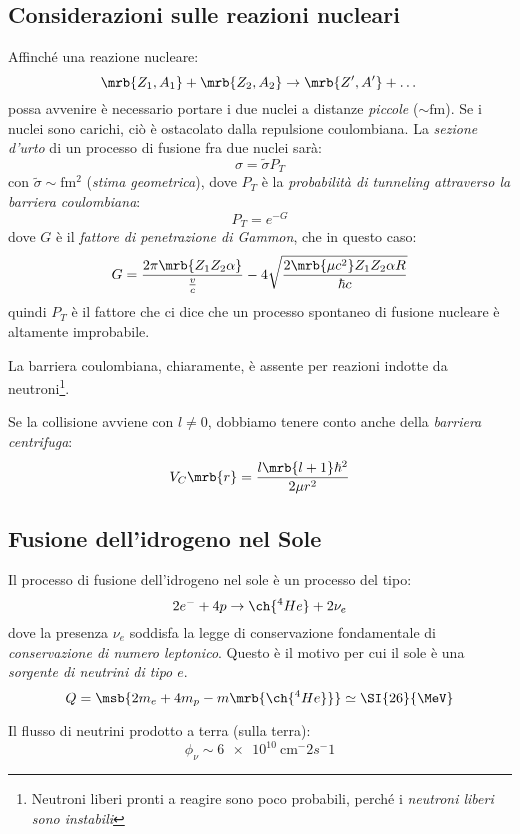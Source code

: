 \subsection{Considerazioni sulle reazioni nucleari}
Affinché una reazione nucleare:
\[
  \mrb{Z_1, A_1} + \mrb{Z_2, A_2} \rightarrow \mrb{Z', A'} + \dots
\]
possa avvenire è necessario portare i due nuclei a distanze \textit{piccole}
($\sim \si{\femto\m}$). Se i nuclei sono carichi, ciò è ostacolato dalla
repulsione coulombiana.
La \textit{sezione d'urto} di un processo di fusione fra due nuclei sarà:
\[
  \sigma = \tilde \sigma P_T
\]
con $\tilde \sigma \sim \si{\femto\m^2}$ (\textit{stima geometrica}), dove
$P_T$ è la \textit{probabilità di tunneling attraverso la barriera
coulombiana}:
\[
  P_T = e^{-G}
\]
dove $G$ è il \textit{fattore di penetrazione di Gammon}, che in questo caso:
\[
  G = \frac{2 \pi \mrb{Z_1 Z_2 \alpha}}{\frac{v}{c}} - 4 \sqrt{\frac{2
  \mrb{\mu c^2} Z_1 Z_2 \alpha R}{\hbar c}}
\]
quindi $P_T$ è il fattore che ci dice che un processo spontaneo di fusione
nucleare è altamente improbabile.
\begin{note}[]
  La barriera coulombiana, chiaramente, è assente per reazioni indotte da
  neutroni\footnote{
    Neutroni liberi pronti a reagire sono poco probabili, perché i
    \textit{neutroni liberi sono instabili}
  }. 
\end{note}
\begin{note}[]
  Se la collisione avviene con $l \neq 0$, dobbiamo tenere conto anche della
  \textit{barriera centrifuga}:
  \[
    V_C \mrb{r} = \frac{l \mrb{l + 1} \hbar^2}{2 \mu r^2}
  \]
\end{note}

\subsection{Fusione dell'idrogeno nel Sole}
Il processo di fusione dell'idrogeno nel sole è un processo del tipo:
\[
  2 e^- + 4p \rightarrow \ch{^4He} + 2 \nu_e
\]
dove la presenza $\nu_e$ soddisfa la legge di conservazione fondamentale di
\textit{conservazione di numero leptonico}. Questo è il motivo per cui il sole
è una \textit{sorgente di neutrini di tipo $e$}.
\[
  Q = \msb{2m_e + 4 m_p - m \mrb{\ch{^{4}He}}} \simeq \SI{26}{\MeV}
\]

Il flusso di neutrini prodotto a terra (sulla terra):
\[
  \phi _{\nu} \sim \SI{6e10}{\cm^-2 s^-1}
\]


